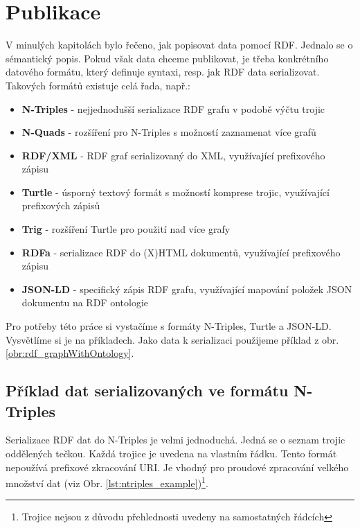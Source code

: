 \newpage

\section{Publikace}

V minulých kapitolách bylo řečeno, jak popisovat data pomocí RDF. Jednalo se o sémantický popis. Pokud však data chceme publikovat, je třeba konkrétního datového formátu, který definuje syntaxi, resp. jak RDF data serializovat. Takových formátů existuje celá řada, např.:

\begin{itemize}
\item \textbf{N-Triples\cite{N-Triples}} - nejjednodušší serializace RDF grafu v podobě výčtu trojic
\item \textbf{N-Quads\cite{N-Quads}} - rozšíření pro N-Triples s možností zaznamenat více grafů
\item \textbf{RDF/XML\cite{RDF/XML}} - RDF graf serializovaný do XML, využívající prefixového zápisu
\item \textbf{Turtle\cite{Turtle}} - úsporný textový formát s možností komprese trojic, využívající prefixových zápisů
\item \textbf{Trig\cite{Trig}} - rozšíření Turtle pro použití nad více grafy
\item \textbf{RDFa\cite{RDFa}} - serializace RDF do (X)HTML dokumentů, využívající prefixového zápisu
\item \textbf{JSON-LD\cite{JSON-LD}} - specifický zápis RDF grafu, využívající mapování položek JSON dokumentu na RDF ontologie
\end{itemize}

Pro potřeby této práce si vystačíme s formáty N-Triples, Turtle a JSON-LD. Vysvětlíme si je na příkladech. Jako data k serializaci použijeme příklad z obr. \ref{obr:rdf_graphWithOntology}.

\subsection{Příklad dat serializovaných ve formátu N-Triples}

Serializace RDF dat do N-Triples je velmi jednoduchá. Jedná se o seznam trojic oddělených tečkou. Každá trojice je uvedena na vlastním řádku. Tento formát nepoužívá prefixové zkracování URI. Je vhodný pro proudové zpracování velkého množství dat (viz Obr. \ref{lst:ntriples_example})\footnote{Trojice nejsou z důvodu přehlednosti uvedeny na samostatných řádcích}.\\

